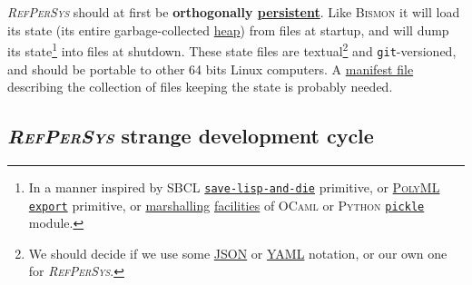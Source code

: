 \documentclass[11pt,a4paper,svgnames]{article}
\newcommand{\RefPerSys}{{\textit{\textsc{RefPerSys}}}}
\begin{document}
{\RefPerSys} should at first be \textbf{orthogonally
  \href{https://en.wikipedia.org/wiki/Persistence\_(computer\_science)}{persistent}}. Like
\textsc{Bismon} \cite{Starynkevitch:2019:bismon-draft} it will load
its state (its entire garbage-collected
\href{https://en.wikipedia.org/wiki/Memory\_management#HEAP}{heap})
from files at startup, and will dump its state\footnote{In a manner
inspired by \textsc{SBCL}
\href{http://www.sbcl.org/manual/index.html\#Saving-a-Core-Image}{\texttt{save-lisp-and-die}}
primitive, or \href{https://www.polyml.org/}{\textsc{PolyML}}
\href{https://www.polyml.org/documentation/Reference/PolyMLStructure.html\#export}{\texttt{export}}
primitive, or
\href{https://en.wikipedia.org/wiki/Marshalling_(computer_science)}{marshalling}
\href{https://caml.inria.fr/pub/docs/manual-ocaml/libref/Marshal.html}{facilities} of \textsc{OCaml} or \textsc{Python}
\href{https://docs.python.org/3/library/pickle.html}{\texttt{pickle}}
module.} into files at shutdown. These state files are
textual\footnote{We should decide if we use some
\href{http://json.org/}{\textsc{JSON}} or
\href{http://yaml.org/}{\textsc{YAML}} notation, or our own one for
\RefPerSys.} and \texttt{git}-versioned, and should be portable to
other 64 bits Linux computers. A
\href{https://en.wikipedia.org/wiki/Manifest\_file}{manifest file}
describing the collection of files keeping the state is probably
needed.

\subsection{{\RefPerSys} strange development cycle}
\label{subsec:strange-devel}
\end{document}
